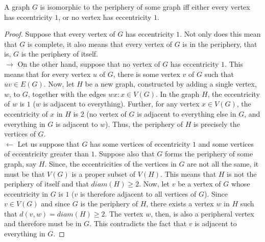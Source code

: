 \documentclass[../basic_graph_theory.tex]{subfiles}
\begin{document}
\begin{Thm}{}{}
    A graph $G$ is isomorphic to the periphery of some graph iff either every vertex has eccentricity $1$, or no vertex has eccentricity $1$.
\end{Thm}{}{}
\begin{proof}
    Suppose that every vertex of $G$ has eccentricity $1$. Not only does this mean that $G$ is complete, it also means that every vertex of $G$ is in the periphery, that is, $G$ is the periphery of itself.\\
    $\rightarrow$ On the other hand, suppose that no vertex of $G$ has eccentricity $1$. This means that for every vertex $u$ of $G$, there is some vertex $v$ of $G$ such that $uv \in E(G)$. Now, let $H$ be a new graph, constructed by adding a single vertex, $w$, to $G$, together with the edges ${wx:x \in V (G)}$. In the graph $H$, the eccentricity of $w$ is $1$ ($w$ is adjacent to everything). Further, for any vertex $x \in V (G)$, the eccentricity of $x$ in $H$ is $2$ (no vertex of $G$ is adjacent to everything else in $G$, and everything in $G$ is adjacent to $w$). Thus, the periphery of $H$ is precisely the vertices of $G$.\\
    $\leftarrow$ Let us suppose that $G$ has some vertices of eccentricity $1$ and some vertices of eccentricity greater than $1$. Suppose also that $G$ forms the periphery of some graph, say $H$. Since, the eccentricities of the vertices in $G$ are not all the same, it must be that $V(G)$ is a proper subset of $V(H)$. This means that $H$ is not the periphery of itself and that $diam(H) \ge 2$. Now, let $v$ be a vertex of $G$ whose eccentricity in $G$ is $1$ ($v$ is therefore adjacent to all vertices of $G$). Since $v \in V(G)$ and since $G$ is the periphery of $H$, there exists a vertex $w$ in $H$ such that $d(v,w) = diam(H) \ge 2$. The vertex $w$, then, is also a peripheral vertex and therefore must be in $G$. This contradicts the fact that $v$ is adjacent to everything in $G$.
\end{proof}
\end{document}
